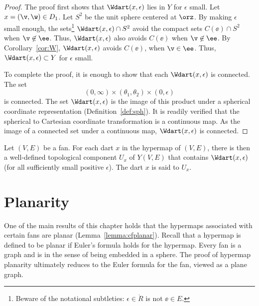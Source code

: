 \begin{proof} The proof first shows that $\Wdart(x,\epsilon)$ lies in
  $Y$ for $\epsilon$ small.  Let $x=(\v,\w)\in D_1$.  Let $S^2$ be
  the unit sphere centered at $\orz$.  By making $\epsilon$ small
  enough, the sets\footnote{Beware of the notational subtleties:
    $\epsilon\in\ring{R}$ is not $\ee\in E$.}  $\Wdart(x,\epsilon)\cap
  S^2$ avoid the compact sets $C(\ee)\cap S^2$ when $\v\not\in \ee$.
  Thus, $\Wdart(x,\epsilon)$ also avoids $C(\ee)$ when $\v\not\in
  \ee$.  By Corollary~\ref{cor:W}, $\Wdart(x,\epsilon)$ avoids
  $C(\ee)$, when $\v\in \ee$.  Thus, $\Wdart(x,\epsilon)\subset Y$ for $\epsilon$ small.

To complete the proof, it is enough to show that each
$\Wdart(x,\epsilon)$ is connected.  The set
\begin{displaymath}
(0,\infty) \times (\theta_1,\theta_2) \times (0,\epsilon)
\end{displaymath}
is connected.  The set $\Wdart(x,\epsilon)$ is the image of this
product under a spherical coordinate representation
(Definition~\ref{def:sph}).  %
It is readily verified that the spherical to Cartesian coordinate
transformation is a continuous map. As the image of a connected set
under a continuous map, $\Wdart(x,\epsilon)$ is connected.
\end{proof}
%
%



\begin{definition}
  Let $(V,E)$ be a fan.  For each dart $x$ in the hypermap of $(V,E)$,
  there is then a well-defined topological component $U_x$ of $Y(V,E)$
  that contains $\Wdart(x,\epsilon)$ (for all sufficiently small
  positive $\epsilon$). The dart $x$ is said to  $U_x$.
\end{definition}
%


\section{Planarity}

One of the main results of this chapter holds that the hypermaps
associated with certain fans are planar (Lemma~\ref{lemma:cfplanar}).
Recall that a hypermap is defined to be planar if Euler's formula
holds for the hypermap.  Every fan is a graph and is  in
the sense of being embedded in a sphere.  The proof of hypermap
planarity ultimately reduces to the Euler formula for the fan, viewed
as a plane graph.

